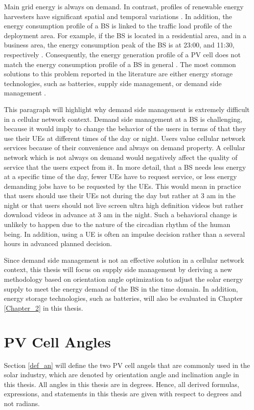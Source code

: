Main grid energy is always on demand. In contrast, profiles of renewable energy harvesters have significant spatial \cite{Renewable_Power} and temporal variations \cite{HengWang2014Sqma}. In addition, the energy consumption profile of a BS is linked to the traffic load profile of the deployment area. For example, if the BS is located in a residential area, and in a business area, the energy consumption peak of the BS is at 23:00, and 11:30, respectively \cite{MarsanMarcoAjmone2013Tzge}. Consequently, the energy generation profile of a PV cell does not match the energy consumption profile of a BS in general \cite{TaoHan2014Pmnw}. The most common solutions to this problem reported in the literature are either energy storage technologies, such as batteries, supply side management, or demand side management \cite{LUTHANDER201580}.

This paragraph will highlight why demand side management is extremely difficult in a cellular network context. Demand side management at a BS is challenging, because it would imply to change the behavior of the users in terms of that they use their UEs at different times of the day or night. Users value cellular network services because of their convenience and always on demand property. A cellular network which is not always on demand would negatively affect the quality of service that the users expect from it. In more detail, that a BS needs less energy at a specific time of the day, fewer UEs have to request service, or less energy demanding jobs have to be requested by the UEs. This would mean in practice that users should use their UEs not during the day but rather at 3 am in the night or that users should not live screen ultra high definition videos but rather download videos in advance at 3 am in the night. Such a behavioral change is unlikely to happen due to the nature of the circadian rhythm of the human being. In addition, using a UE is often an impulse decision rather than a several hours in advanced planned decision.


Since demand side management is not an effective solution in a cellular network context, this thesis will focus on supply side management by deriving a new methodology based on orientation angle optimization to adjust the solar energy supply to meet the energy demand of the BS in the time domain. In addition, energy storage technologies, such as batteries, will also be evaluated in Chapter \ref{Chapter_2} in this thesis.



\section{PV Cell Angles\label{def_an}}
Section \ref{def_an} will define the two PV cell angels that are commonly used in the solar industry, which are denoted by orientation angle and inclination angle in this thesis. All angles in this thesis are in degrees.
Hence, all derived formulas, expressions, and statements in this thesis are given with respect to degrees and not radians. 


